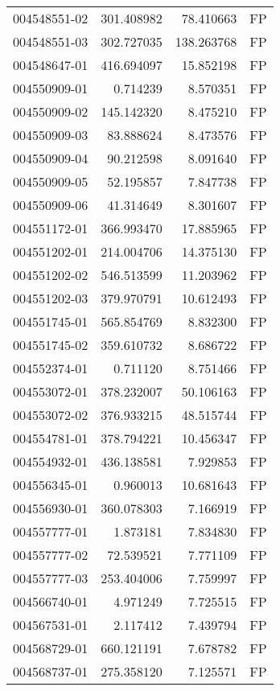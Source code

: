 \begin{tabular}{lrrl}
004548551-02 &  301.408982 &    78.410663 &   FP \\
004548551-03 &  302.727035 &   138.263768 &   FP \\
004548647-01 &  416.694097 &    15.852198 &   FP \\
004550909-01 &    0.714239 &     8.570351 &   FP \\
004550909-02 &  145.142320 &     8.475210 &   FP \\
004550909-03 &   83.888624 &     8.473576 &   FP \\
004550909-04 &   90.212598 &     8.091640 &   FP \\
004550909-05 &   52.195857 &     7.847738 &   FP \\
004550909-06 &   41.314649 &     8.301607 &   FP \\
004551172-01 &  366.993470 &    17.885965 &   FP \\
004551202-01 &  214.004706 &    14.375130 &   FP \\
004551202-02 &  546.513599 &    11.203962 &   FP \\
004551202-03 &  379.970791 &    10.612493 &   FP \\
004551745-01 &  565.854769 &     8.832300 &   FP \\
004551745-02 &  359.610732 &     8.686722 &   FP \\
004552374-01 &    0.711120 &     8.751466 &   FP \\
004553072-01 &  378.232007 &    50.106163 &   FP \\
004553072-02 &  376.933215 &    48.515744 &   FP \\
004554781-01 &  378.794221 &    10.456347 &   FP \\
004554932-01 &  436.138581 &     7.929853 &   FP \\
004556345-01 &    0.960013 &    10.681643 &   FP \\
004556930-01 &  360.078303 &     7.166919 &   FP \\
004557777-01 &    1.873181 &     7.834830 &   FP \\
004557777-02 &   72.539521 &     7.771109 &   FP \\
004557777-03 &  253.404006 &     7.759997 &   FP \\
004566740-01 &    4.971249 &     7.725515 &   FP \\
004567531-01 &    2.117412 &     7.439794 &   FP \\
004568729-01 &  660.121191 &     7.678782 &   FP \\
004568737-01 &  275.358120 &     7.125571 &   FP \\

\end{tabular}
